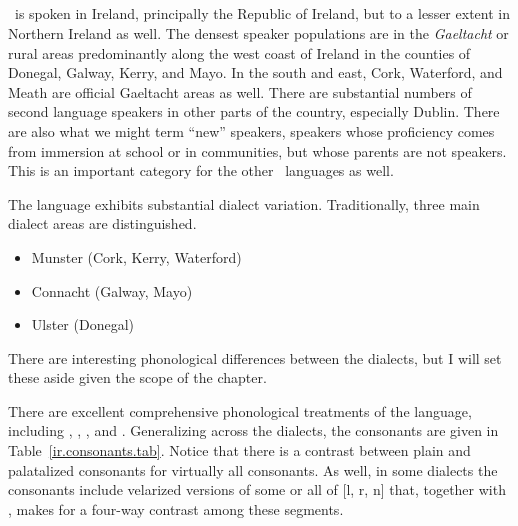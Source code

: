 \documentclass[output=paper,colorlinks,citecolor=brown]{langscibook}
\begin{document}

\subsection{\ir}

\ir\ is spoken in Ireland, principally the Republic of Ireland, but to a lesser extent in Northern Ireland as well. The densest speaker populations are in the \emph{Gaeltacht} or rural areas predominantly along the west coast of Ireland in the counties of Donegal, Galway, Kerry, and Mayo. In the south and east, Cork, Waterford, and Meath are official Gaeltacht areas as well. There are substantial numbers of second language speakers in other parts of the country, especially Dublin. There are also what we might term ``new'' speakers, speakers whose proficiency comes from immersion at school or in communities, but whose parents are not speakers. This is an important category for the other \ce\ languages as well.

The language exhibits substantial dialect variation. Traditionally, three main dialect areas are distinguished.

\begin{itemize}
\item Munster (Cork, Kerry, Waterford)
\item Connacht (Galway, Mayo)
\item Ulster (Donegal)
\end{itemize}

\noindent There are interesting phonological differences between the dialects, but I will  set these aside given the scope of the chapter.

There are excellent comprehensive phonological treatments of the language, including \citet{ni.chiosain.diss}, \citet{green.diss}, \citet{hickey}, and \citet{o.siadhail}. Generalizing across the dialects, the consonants are given in Table~\ref{ir.consonants.tab}. Notice that there is a contrast between plain  and palatalized consonants for virtually all consonants. As well, in some dialects the consonants include velarized versions of some or all of [l, r, n] that, together with , makes for a four-way contrast among these segments.
\end{document}
